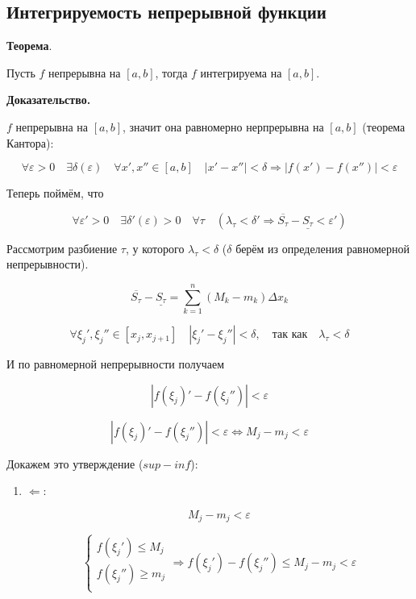 \documentclass[a4paper]{article}
\begin{document}
\begin{definit}
\hypertarget{p7}{}
\subsection*{Интегрируемость непрерывной функции}

\begin{htheorem}\textbf{Теорема}.

Пусть $f$ непрерывна на $[a,b]$, тогда $f$ интегрируема на $[a,b]$.
\end{htheorem}


\begin{hproof}\textbf{Доказательство.}

$f$ непрерывна на $[a,b]$, значит она равномерно нерпрерывна на $[a,b]$ (теорема Кантора):

\[
\forall \varepsilon > 0 \quad \exists \delta ( \varepsilon ) \quad \forall x', x'' \in [a,b] \quad |x'-x''| < \delta \Rightarrow |f(x') - f(x'')| < \varepsilon
\]

Теперь поймём, что 

\[
\forall \varepsilon' > 0 \quad \exists \delta'(\varepsilon) > 0 \quad \forall \tau \quad (\lambda_\tau < \delta' \Rightarrow \overline{S_\tau} - \underline{S_\tau} < \varepsilon')
\]

Рассмотрим разбиение $\tau$, у которого $\lambda_\tau < \delta$ ($\delta$ берём из определения равномерной непрерывности).

\[
\overline{S_\tau} - \underline{S_\tau} = \sum_{k=1}^n (M_k-m_k) \Delta x_k
\]

\[
\forall \xi_j', \xi_j'' \in [x_j, x_{j+1}] \quad |\xi_j' - \xi_j''| < \delta, \quad \text{так как} \quad \lambda_\tau < \delta
\]

И по равномерной непрерывности получаем

\[
|f(\xi_j)' - f(\xi_j'')| < \varepsilon
\]

\hypertarget{supinf}{}
\[
|f(\xi_j)' - f(\xi_j'')| < \varepsilon \Leftrightarrow M_j - m_j < \varepsilon
\]

Докажем это утверждение ($sup - inf$):
\begin{enumerate}
\item $\Leftarrow$:

\[
M_j - m_j < \varepsilon
\]

\[
\begin{cases}
f(\xi_j') \leq M_j \\
f(\xi_j'') \geq m_j \\
\end{cases}
\Rightarrow f(\xi_j') - f(\xi_j'') \leq M_j-m_j < \varepsilon
\]


\end{enumerate}
\end{hproof}
\end{definit}
\end{document}
